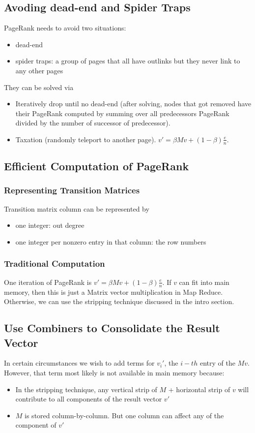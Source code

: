 \subsection{Avoding dead-end and Spider Traps} 
PageRank needs to avoid two situations: 
    \begin{itemize}
        \item dead-end 
        \item spider traps: a group of pages that all have outlinks but they never link to any other pages 
    \end{itemize}
They can be solved via 
    \begin{itemize}
        \item Iteratively drop until no dead-end (after solving, nodes that got removed have their PageRank computed by summing over all predecessors PageRank divided by the number of successor of predecessor). 
        \item Taxation (randomly teleport to another page). $v' = \beta M v + (1 - \beta) \frac{e}{n}$. 
    \end{itemize}
    
\subsection{Efficient Computation of PageRank} 

\subsubsection{Representing Transition Matrices}
Transition matrix column can be represented by 
    \begin{itemize}
        \item one integer: out degree 
        \item one integer per nonzero entry in that column: the row numbers
    \end{itemize}

\subsubsection{Traditional Computation} 
One iteration of PageRank is $v' = \beta M v + (1 - \beta) \frac{e}{n}$. If $v$ can fit into main memory, then this is just a Matrix vector multiplication in Map Reduce. Otherwise, we can use the stripping technique discussed in the intro section. 

\subsection{Use Combiners to Consolidate the Result Vector} 
In certain circumstances we wish to add terms for $v_i'$, the $i-th$ entry of the $Mv$. However, that term most likely is not available in main memory because: 
    \begin{itemize}
        \item In the stripping technique, any vertical strip of $M$ + horizontal strip of $v$ will contribute to all components of the result vector $v'$
        \item $M$ is stored column-by-column. But one column can affect any of the component of $v'$
    \end{itemize}

